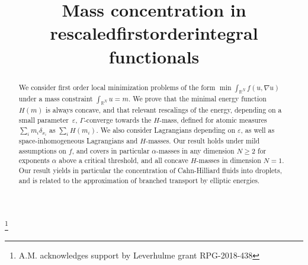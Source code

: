 \documentclass[JEP,XML,SOM,Unicode,published]{cedram}
\theoremstyle{plain}
\theoremstyle{definition}
\begin{document}
\title{Mass concentration in rescaled\nobreakspace first\nobreakspace order\nobreakspace integral functionals}

\author[\initial{A.} \lastname{Monteil}]{ }
\address{Université Paris-Est Créteil Val-de-Marne, LAMA,\\
61 avenue du Général de Gaulle, 94010 Créteil, France}

\author[\initial{P.} \lastname{Pegon}]{ }
\address{Universit\'e Paris-Dauphine, CEREMADE \& INRIA Paris, MOKAPLAN,\\
France}

\thanks{A.M. acknowledges support by Leverhulme grant RPG-2018-438}

\begin{abstract}
We consider first order local minimization problems of the form $\min \int_{\mathbb{R}^N}f(u,\nabla u)$ under a mass constraint $\int_{\mathbb{R}^N}u=m$. We prove that the minimal energy function $H(m)$ is always concave, and that relevant rescalings of the energy, depending on a small parameter~$\varepsilon$, $\Gamma$-converge towards the $H$-mass, defined for atomic measures $\sum_i m_i\delta_{x_i}$ as $\sum_i H(m_i)$. We also consider Lagrangians depending on $\varepsilon$, as well as space-inhomogeneous Lagrangians and $H$\nobreakdash-masses. Our result holds under mild assumptions on $f$, and covers in particular $\alpha$-masses in any dimension $N\geq 2$ for exponents $\alpha$ above a critical threshold, and all concave $H$-masses in dimension $N=1$. Our result yields in particular the concentration of Cahn-Hilliard fluids into droplets, and is related to the approximation of branched transport by elliptic energies.
\end{abstract}




\end{document}
